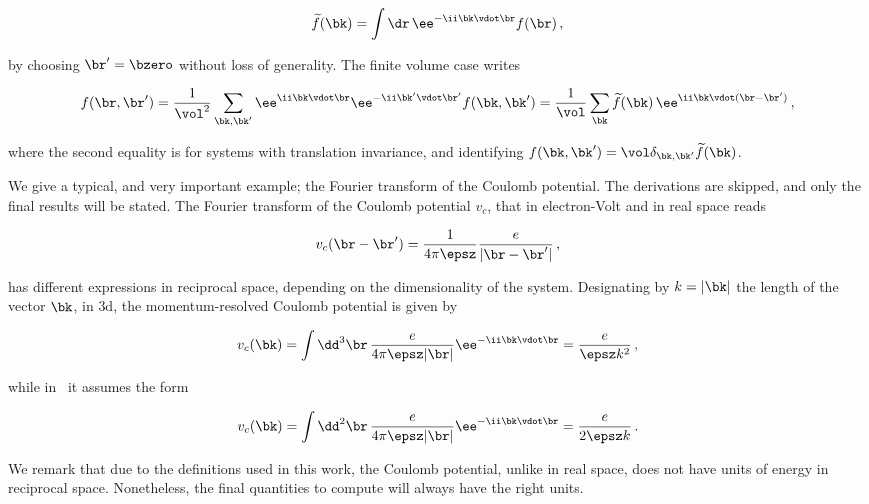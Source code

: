 \begin{equation}
    \widetilde{f}(\bk)=\int\dr\,\ee^{-\ii \bk \vdot \br}f(\br)\,,
\end{equation}

\noindent by choosing $\br'=\bzero$ without loss of generality.
The finite volume case writes

\begin{equation}
    \label{eq:finite_volume_two_point_inverse_Fourier}
    f(\br,\br')=\frac{1}{\vol^{2}}\sum_{\bk,\bk'}\ee^{\ii \bk \vdot \br}\ee^{-\ii \bk' \vdot \br'}f(\bk,\bk')=\frac{1}{\vol}\sum_{\bk}\widetilde{f}(\bk)\,\ee^{\ii \bk \vdot (\br-\br')}\,,
\end{equation}

\noindent where the second equality is for systems with translation invariance, and identifying $f(\bk,\bk')=\vol\delta_{\bk,\bk'}\widetilde{f}(\bk)$.

We give a typical, and very important example; the Fourier transform of the Coulomb potential.
The derivations are skipped, and only the final results will be stated.
The Fourier transform of the Coulomb potential $v_{c}$, that in electron-Volt and in real space reads

\begin{equation}
    v_{c}(\br-\br')=\frac{1}{4\pi \epsz }\frac{e}{|\br-\br'|}\,,
\end{equation}

\noindent has different expressions in reciprocal space, depending on the dimensionality of the system.
Designating by $k = |\bk|$ the length of the vector $\bk$, in \gls{3d}, the momentum-resolved Coulomb potential is given by

\begin{equation}
    v_{c}(\bk)=\int\dd^{3}\br\,\frac{e}{4\pi \epsz |\br|}\ee^{-\ii \bk \vdot \br}=\frac{e}{ \epsz k^{2}}\,,
\end{equation}

\noindent while in \bd~it assumes the form

\begin{equation}
    v_{c}(\bk)=\int\dd^{2}\br\,\frac{e}{4\pi \epsz |\br|}\ee^{-\ii \bk \vdot \br}=\frac{e}{2 \epsz k}\,.
\end{equation}

We remark that due to the definitions used in this work, the Coulomb potential, unlike in real space, does not have units of energy in reciprocal space.
Nonetheless, the final quantities to compute will always have the right units.

